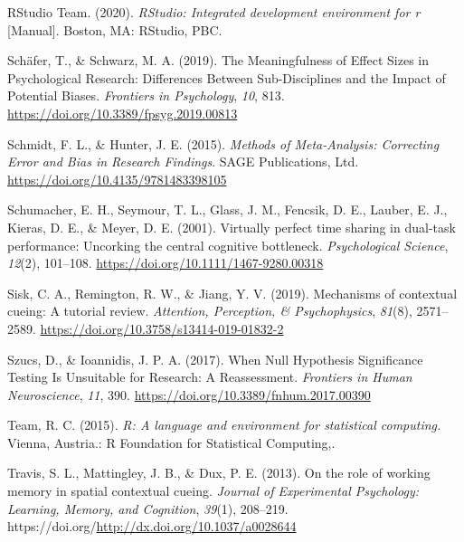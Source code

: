 \documentclass[
  man]{apa6}
\newlength{\cslhangindent}
\newlength{\cslentryspacingunit} %
\newenvironment{CSLReferences}[2] %
 {%
  \setlength{\parindent}{0pt}
  \ifodd #1
  \let\oldpar\par
  \def\par{\hangindent=\cslhangindent\oldpar}
  \fi
  \setlength{\parskip}{#2\cslentryspacingunit}
 }%
 {}
\begin{document}
\begin{CSLReferences}{1}{0}
\leavevmode{}%
RStudio Team. (2020). \emph{{RStudio}: {Integrated} development environment for r} {[}Manual{]}. {Boston, MA}: {RStudio, PBC.}

\leavevmode{}%
Schäfer, T., \& Schwarz, M. A. (2019). The {Meaningfulness} of {Effect Sizes} in {Psychological Research}: {Differences Between Sub-Disciplines} and the {Impact} of {Potential Biases}. \emph{Frontiers in Psychology}, \emph{10}, 813. \url{https://doi.org/10.3389/fpsyg.2019.00813}

\leavevmode{}%
Schmidt, F. L., \& Hunter, J. E. (2015). \emph{Methods of {Meta-Analysis}: {Correcting Error} and {Bias} in {Research Findings}}. {SAGE Publications, Ltd}. \url{https://doi.org/10.4135/9781483398105}

\leavevmode{}%
Schumacher, E. H., Seymour, T. L., Glass, J. M., Fencsik, D. E., Lauber, E. J., Kieras, D. E., \& Meyer, D. E. (2001). Virtually perfect time sharing in dual-task performance: Uncorking the central cognitive bottleneck. \emph{Psychological Science}, \emph{12}(2), 101--108. \url{https://doi.org/10.1111/1467-9280.00318}

\leavevmode{}%
Sisk, C. A., Remington, R. W., \& Jiang, Y. V. (2019). Mechanisms of contextual cueing: {A} tutorial review. \emph{Attention, Perception, \& Psychophysics}, \emph{81}(8), 2571--2589. \url{https://doi.org/10.3758/s13414-019-01832-2}

\leavevmode{}%
Szucs, D., \& Ioannidis, J. P. A. (2017). When {Null Hypothesis Significance Testing Is Unsuitable} for {Research}: {A Reassessment}. \emph{Frontiers in Human Neuroscience}, \emph{11}, 390. \url{https://doi.org/10.3389/fnhum.2017.00390}

\leavevmode{}%
Team, R. C. (2015). \emph{R: {A} language and environment for statistical computing.} {Vienna, Austria.}: R Foundation for Statistical Computing,.

\leavevmode{}%
Travis, S. L., Mattingley, J. B., \& Dux, P. E. (2013). On the role of working memory in spatial contextual cueing. \emph{Journal of Experimental Psychology: Learning, Memory, and Cognition}, \emph{39}(1), 208--219. https://doi.org/\url{http://dx.doi.org/10.1037/a0028644}


\end{CSLReferences}
\end{document}
